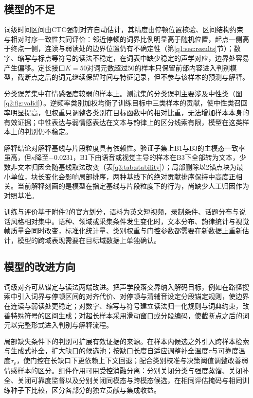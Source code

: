 \subsection{模型的不足}

词级时间区间由CTC强制对齐自动估计，其精度由停顿位置核验、区间结构约束与相对时序一致性共同评价：邻近停顿的词界比例明显高于随机位置，起点一侧高于终点一侧，连读与弱读处的边界位置仍有不确定性（第\ref{q1:sec:results}节）；数字、缩写与标点等符号的读法不稳定，在词表中缺少稳定的声学对应，边界处容易产生偏移。定长接口$K=50$对词元数超过50的样本只保留前部内容进入判别模型，截断点之后的词元继续保留时间与特征记录，但不参与该样本的预测与解释。

分类误差集中在情感强度较弱的样本上。测试集的分类误判主要涉及中性类（图\ref{q2:fig:valid}）。逆频率类别加权均衡了训练目标中三类样本的贡献，使中性类召回率明显提高，但权重只调整各类别在目标函数中的相对比重，无法增加样本本身的有效证据；中性表达与弱情感表达在文本与韵律上的区分线索有限，模型在这类样本上的判别仍不稳定。

解释结论对解释基线与片段粒度具有依赖性。验证子集上B1与B3的主模态一致率虽高，但$\kappa$降至$-0.0231$，B1下由语音或视觉主导的样本在B3下全部转为文本，少数非文本归因会随基线取法改变（表\ref{q3:tab:stability}）；局部删除以2锚点块为最小单位，块长变化会影响局部排序，两种基线下的绝对贡献排序保持中高度正相关。当前解释刻画的是模型在指定基线与片段粒度下的行为，尚缺少人工归因作为对照基准。

训练与评价基于附件2的官方划分，语料为英文短视频，录制条件、话题分布与说话风格相对集中。语种、领域或采集条件发生变化时，文本分布、韵律统计与视觉帧质量会同时改变，标准化统计量、类别权重与门控参数都需要在新数据上重新估计，模型的跨域表现需要在目标域数据上单独确认。

\subsection{模型的改进方向}

词级对齐可从锚定与读法两端改进。把声学段落交界纳入解码目标，例如在路径搜索中引入词界与停顿区间的对齐代价、对停顿与清辅音设定分段锚定规则，使边界在连读与弱读处更稳定；对数字、缩写与符号建立读法归一化规则与词典约束，改善特殊符号的区间生成；对超长样本采用滑动窗口或分段编码，使截断点之后的词元以完整形式进入判别与解释流程。

局部缺失条件下的判别可扩展有效证据的来源。在样本内候选之外引入跨样本检索与生成式补全，扩大缺口的候选池；按缺口长度自适应调整补全温度$\tau$与可靠度温度$\tau_\rho$，使门控在长缺口下更依赖上下文回退；配合类别校准与决策阈值调整改善弱情感样本的区分。组件作用可用受控消融分离：分别关闭分类与强度蒸馏、关闭补全、关闭可靠度监督以及分别关闭同模态与跨模态候选，在相同评估掩码与相同训练种子下比较，区分各部分的独立贡献与集成收益。

